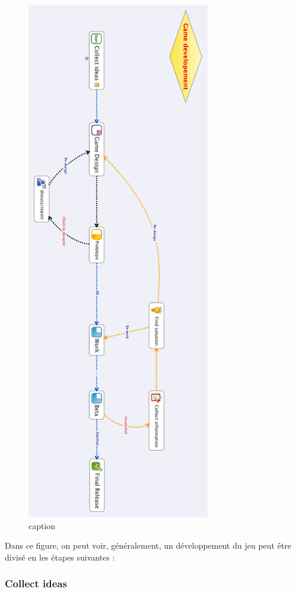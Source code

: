 \begin{figure}[htbp]
	\centering
		\includegraphics[height=9in]{XMinds/Gamedevelopement.png}
	\caption{caption}
	\label{fig:XMinds_Gamedevelopement}
\end{figure}

Dans ce figure, on peut voir, généralement, un développement du jeu peut être divisé en les étapes suivantes :

\subsubsection{Collect ideas} %

